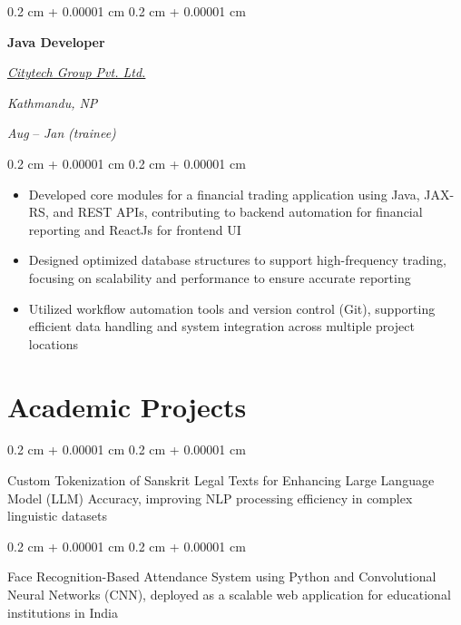\documentclass[10pt, letterpaper]{article}
\newenvironment{highlights}{
    \begin{itemize}[
        topsep=0.10 cm,
        parsep=0.10 cm,
        partopsep=0pt,
        itemsep=0pt,
        leftmargin=0.4 cm + 10pt
    ]
}{
    \end{itemize}
} %
\newenvironment{onecolentry}{
    \begin{adjustwidth}{
        0.2 cm + 0.00001 cm
    }{
        0.2 cm + 0.00001 cm
    }
}{
    \end{adjustwidth}
} %
\newenvironment{twocolentry}[2][]{
    \onecolentry
    \def\secondColumn{#2}
    \setcolumnwidth{\fill, 10 cm}
    \begin{paracol}{2}
}{
    \switchcolumn \raggedleft \secondColumn
    \end{paracol}
    \endonecolentry
} %
\begin{document}
\vspace{0.2 cm}

\begin{twocolentry}{
\textit{Kathmandu, NP}    

\textit{Aug} \text{2020} – \textit{Jan} \text{2021} \textit{(trainee)}}
    \textbf{Java Developer}

    \href{https://citytechgroup.com/}{\textit{Citytech Group Pvt. Ltd.}}
    
\end{twocolentry}

\vspace{0.10 cm}
\begin{onecolentry}
    \begin{highlights}
        \item Developed core modules for a financial trading application using Java, JAX-RS, and REST APIs, contributing to backend automation for financial reporting and ReactJs for frontend UI
        \item Designed optimized database structures to support high-frequency trading, focusing on scalability and performance to ensure accurate reporting
        \item Utilized workflow automation tools and version control (Git), supporting efficient data handling and system integration across multiple project locations
    \end{highlights}
\end{onecolentry}






\section{Academic Projects}

\begin{onecolentry}
    Custom Tokenization of Sanskrit Legal Texts for Enhancing Large Language Model (LLM) Accuracy, improving NLP processing efficiency in complex linguistic datasets
\end{onecolentry}

\vspace{0.2 cm}

\begin{onecolentry}
    Face Recognition-Based Attendance System using Python and Convolutional Neural Networks (CNN), deployed as a scalable web application for educational institutions in India
\end{onecolentry}
\end{document}
